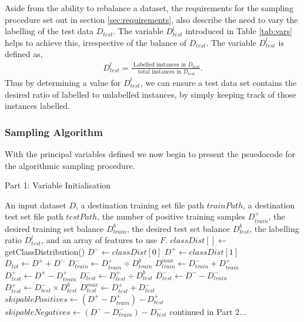 \documentclass[twoside,a4paper]{refart}
\begin{document}
Aside from the ability to rebalance a dataset, the requirements for the sampling procedure set out in section \ref{sec:requirements}, also describe the need to vary the labelling of the test data $D_{test}$. The variable $D_{test}^{l}$ introduced in Table \ref{tab:vars} helps to achieve this, irrespective of the balance of $D_{test}$. The variable $D_{test}^{l}$ is defined as, 
\begin{eqnarray*}
D_{test}^{l}=\frac{\textrm{ Labelled instances in } D_{test}}{\textrm{ total instances in } D_{test}} \textrm{.}
\end{eqnarray*}
Thus by determining a value for $D_{test}^{l}$, we can ensure a test data set contains the desired ratio of labelled to unlabelled instances, by simply keeping track of those instances labelled.
\newpage
\subsubsection{Sampling Algorithm}
With the principal variables defined we now begin to present the psuedocode for the algorithmic sampling procedure.
\begin{algorithm}
\small
\caption{Part 1: Variable Initialisation}
\begin{algorithmic}[1]
\Require An input dataset $D$, a destination training set file path $trainPath$, a destination test set file path $testPath$, the number of positive training samples $D_{train}^{+}$, the desired training set balance $D_{train}^{b}$, the desired test set balance $D_{test}^{b}$, the labelling ratio $D_{test}^{l}$, and an array of features to use $F$.
\State $classDist[] \leftarrow$ getClassDistribution()
\State $D^{-} \leftarrow classDist[0]$ 
\State $D^{+} \leftarrow classDist[1]$
\State $D_{tot} \leftarrow D^{+}+D^{-}$ 
\State $D_{train}^{-} \leftarrow D_{train}^{+} \div D_{train}^{b}$
\State $D_{train}^{max} \leftarrow D_{train}^{-}+D_{train}^{+}$
\State $D_{test}^{+} \leftarrow D^{+}-D_{train}^{+}$ 
\State $D_{test}^{-} \leftarrow D_{test}^{+} \div D_{test}^{b}$
	\State $D_{test}^{-}  \leftarrow D^{-}-D_{train}^{-}$
	\State $D_{test}^{+}  \leftarrow D_{test}^{-} \times D_{test}^{b}$
\EndIf
\State $D_{test}^{max} \leftarrow D_{test}^{+}+D_{test}^{-}$
\State $skipablePositives \leftarrow (D^{+}-D_{train}^{+})-D_{test}^{+}$
\State $skipableNegatives \leftarrow (D^{-}-D_{train}^{-})-D_{test}^{-}$
               \State \Comment continued in Part 2...
\end{algorithmic}
\end{algorithm}
\end{document}
